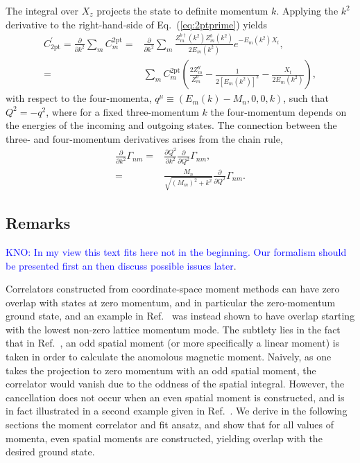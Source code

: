\documentclass{PoS}
\newcommand{\kno}[1]{\textcolor{blue}{#1}}
\begin{document}
The integral over $X_z$ projects the state to definite momentum $k$. Applying the $k^2$ derivative to the right-hand-side of Eq.~(\ref{eq:2ptprime}) yields
\begin{align}
C^\prime_{\text{2pt}} =\frac{\partial}{\partial k^2} \sum_m C_m^{\text{2pt}}= & \frac{\partial}{\partial k^2} \sum_m \frac{Z^{b\dagger}_m(k^2)Z^b_m(k^2)}{2E_m(k^2)}e^{-E_m(k^2)X_t},\\
= & \sum_m C^{\text{2pt}}_m \left(\frac{2Z_m^{b\prime}}{Z_m^b} - \frac{1}{2[E_m(k^2)]^2}-\frac{X_t}{2E_m(k^2)}\right),
\end{align}
with respect to the four-momenta, $q^\mu\equiv (E_m(k) - M_n, 0, 0, k)$, such that $Q^2=-q^2$, where for a fixed three-momentum $k$ the four-momentum depends on the energies of the incoming and outgoing states. The connection between the three- and four-momentum derivatives arises from the chain rule,
\begin{align}
\frac{\partial}{\partial k^2} \Gamma_{nm} = & \frac{\partial Q^2}{\partial k^2}\frac{\partial}{\partial Q^2}\Gamma_{nm},\\
= & \frac{M_n}{\sqrt{(M_m)^2+k^2}}\frac{\partial}{\partial Q^2} \Gamma_{nm}.
\end{align}


\subsection{Remarks}
\kno{KNO: In my view this text fits here not in the beginning. Our formalism should be presented first an then discuss possible issues later}.


Correlators constructed from coordinate-space moment methods can have zero overlap with states at zero momentum, and in particular the zero-momentum ground state, and an example in  Ref.~\cite{Wilcox:2002zt} was instead shown to have overlap starting with the lowest non-zero lattice momentum mode. The subtlety lies in the fact that in Ref.~\cite{Wilcox:2002zt}, an odd spatial moment (or more specifically a linear moment) is taken in order to calculate the anomolous magnetic moment. Naively, as one takes the projection to zero momentum with an odd spatial moment, the correlator would vanish due to the oddness of the spatial integral.  However, the cancellation does not occur when an even spatial moment is constructed, and is in fact illustrated in a second example given in Ref.~\cite{Wilcox:2002zt}. We derive in the following sections the moment correlator and fit ansatz, and show that for all values of momenta, even spatial moments are constructed, yielding overlap with the desired ground state.
\end{document}
